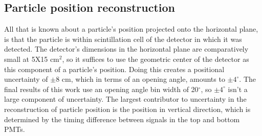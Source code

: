 \subsection{Particle position reconstruction}
All that is known about a particle's position projected onto the horizontal plane, is that the particle is within scintillation cell of the detector in which it was detected. The detector's dimensions in the horizontal plane are comparatively small at 5X15 cm$^2$, so it suffices to use the geometric center of the detector as this component of a particle's position. Doing this creates a positional uncertainty of $\pm$8 cm, which in terms of an opening angle, amounts to $\pm4^{\circ}$. The final results of this work use an opening angle bin width of 20$^{\circ}$, so $\pm4^{\circ}$ isn't a large component of uncertainty. The largest contributor to uncertainty in the reconstruction of particle position is the position in vertical direction, which is determined by the timing difference between signals in the top and bottom PMTs. 

